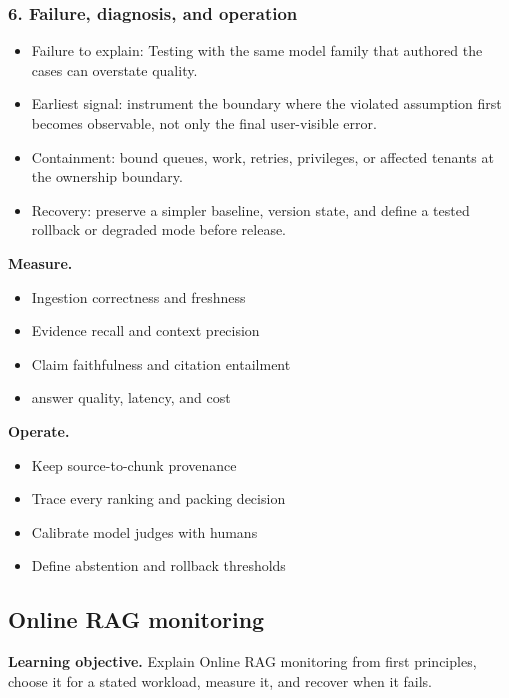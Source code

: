 \subsubsection*{6. Failure, diagnosis, and operation}
\begin{itemize}
\item Failure to explain: Testing with the same model family that authored the cases can overstate quality.
\item Earliest signal: instrument the boundary where the violated assumption first becomes observable, not only the final user-visible error.
\item Containment: bound queues, work, retries, privileges, or affected tenants at the ownership boundary.
\item Recovery: preserve a simpler baseline, version state, and define a tested rollback or degraded mode before release.
\end{itemize}
\textbf{Measure.}\begin{itemize}
\item Ingestion correctness and freshness
\item Evidence recall and context precision
\item Claim faithfulness and citation entailment
\item answer quality, latency, and cost
\end{itemize}
\textbf{Operate.}\begin{itemize}
\item Keep source-to-chunk provenance
\item Trace every ranking and packing decision
\item Calibrate model judges with humans
\item Define abstention and rollback thresholds
\end{itemize}
\subsection{Online RAG monitoring}
\textbf{Learning objective.} Explain Online RAG monitoring from first principles, choose it for a stated workload, measure it, and recover when it fails.
